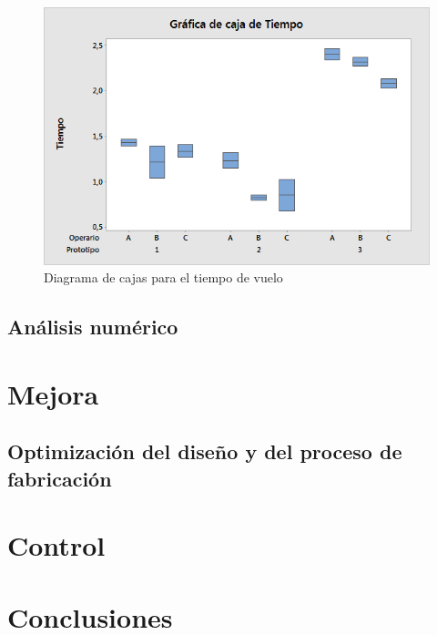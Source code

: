 \documentclass[12pt,a4paper,twoside,openright,titlepage,final]{article}
\begin{document}
\begin{figure}[htbp!]
	\centering
	\includegraphics[width=0.7\linewidth]{imagenes/Grafica_de_caja_de_Tiempo}
	\caption{Diagrama de cajas para el tiempo de vuelo}
	\label{fig:diagrama_cajas}
\end{figure}

\subsection{Análisis numérico}

\section{Mejora}

\subsection{Optimización del diseño y del proceso de fabricación}

\section{Control}

\section{Conclusiones}
\end{document}

